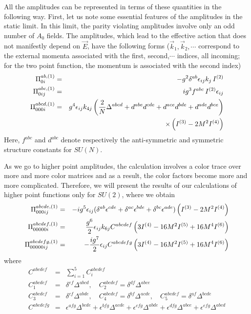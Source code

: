 \documentclass[a4paper,12pt]{article}
\begin{document}
All the amplitudes can be represented in terms of these quantities in
the following way. First, let us  note some essential
features of the amplitudes in the static limit. In this limit, the
parity violating amplitudes involve only an odd number of $A_{0}$
fields. The amplitudes, which lead to the effective action that does
not manifestly depend on $\vec{E}$, have the
following forms ($\vec{k}_{1},\vec{k}_{2},\cdots$ correspond to the
external momenta associated with the first, second,$\cdots$ indices,
all incoming; for the two point function, the momentum is associated
with the second index)
\begin{eqnarray}
\Pi_{0i}^{ab, (1)} & = & -
g^{2}\delta^{ab}\epsilon_{ij} k_{j}\,I^{(2)}\nonumber\\
\Pi_{0ij}^{abc, (1)} & = & ig^{3}f^{abc}\,I^{(2)}\epsilon_{ij}\nonumber\\
\Pi_{000i}^{abcd, (1)} & = & g^{4}\epsilon_{ij}k_{4j}\left({2\over
    N} \Delta^{abcd} + 
d^{abe}d^{cde}+d^{ace}d^{bde}+d^{ade}d^{bce}\right)\nonumber\\
 &  &\;\;\; \times \left(I^{(3)}-2M^{2}I^{(4)}\right)\label{5}
\end{eqnarray}
Here, $f^{abc}$ and $d^{abc}$ denote respectively the anti-symmetric
and symmetric structure constants for $SU(N)$.

As we go to higher point amplitudes, the calculation involves a color
trace over more and more color matrices and as a result, the color
factors become more and more complicated. Therefore, we will present
the results of our calculations of higher point functions only for
$SU(2)$, where we obtain
\begin{eqnarray}
\Pi_{000ij}^{abcde, (1)} & = & - ig^{5}\epsilon_{ij}
(\delta^{ab}\epsilon^{cde}+\delta^{ac}\epsilon^{bde}+
\delta^{bc}\epsilon^{ade}) 
\left(I^{(3)}-2M^{2}I^{(4)}\right)\nonumber\\
\Pi_{00000i}^{abcdef, (1)} & = &  {g^{6}\over 2}
\epsilon_{ij}k_{6j} C^{abcdef}
\left(3I^{(4)}-16M^{2}I^{(5)}+16M^{4}I^{(6)}\right)\nonumber\\
\Pi_{00000ij}^{abcdefg, (1)} & = & -{ig^{7}\over 2}
\epsilon_{ij} C^{abcdefg}
\left(3I^{(4)}-16M^{2}I^{(5)}+16M^{4}I^{(6)}\right)\label{6}
\end{eqnarray}
where
\begin{eqnarray}
C^{abcdef} & = & \sum_{i=1}^{5} C_{i}^{abcdef}\nonumber\\
C_{1}^{abcdef} & = &
\delta^{ef} \Delta^{abcd}, \quad C_{2}^{abcdef} =
\delta^{df} \Delta^{abce}\nonumber\\
C_{3}^{abcdef} & = & \delta^{cf} \Delta^{abde}, \quad C_{4}^{abcdef} =
\delta^{bf} \Delta^{acde},\quad C_{5}^{abcdef} = \delta^{af}
\Delta^{bcde}\nonumber\\ 
C^{abcdefg} & = &
\epsilon^{afg} \Delta^{bcde} + 
\epsilon^{bfg} \Delta^{acde}
  + \epsilon^{cfg} \Delta^{abde} + \epsilon^{dfg} \Delta^{abce}
 + \epsilon^{efg} \Delta^{abcd}\label{7}
\end{eqnarray}
\end{document}
